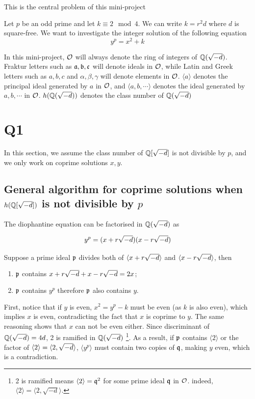 This is the central problem of this mini-project
\begin{problem}
	Let $p$ be an odd prime and let $k \equiv 2 \mod 4$. 
	We can write $k = r^2d$ where $d$ is square-free. 
	We want to investigate the integer solution of the following equation
	\begin{equation}\label{eq:main}
	y^p = x^2 + k
\end{equation}
\end{problem}

In this mini-project, $\mathcal{O}$ will always denote the ring of integers of $\mathbb{Q}(\sqrt{-d})$. 
Fraktur letters such as $\mathfrak{a}, \mathfrak{b}, \mathfrak{c}$ will denote ideals in $\mathcal{O}$, while Latin and Greek letters such as $a, b, c$ and $\alpha, \beta, \gamma$ will denote elements in $\mathcal{O}$.
$\langle a \rangle$ denotes the principal ideal generated by $a$ in $\mathcal{O}$, and $\langle a, b, \cdots \rangle$ denotes the ideal generated by $a, b, \cdots$ in $\mathcal{O}$.
$h(\mathbb{Q}(\sqrt{-d}))$ denotes the class number of $\mathbb{Q}(\sqrt{-d})$

\section{Q1}

In this section, we assume the class number of $\mathbb{Q}[\sqrt{-d}]$ is not divisible by $p$, and we only work on coprime solutions $x, y$.

\subsection{General algorithm for coprime solutions when \texorpdfstring{$h(\mathbb{Q}[\sqrt{-d}])$ is not divisible by $p$}{}}

The diophantine equation can be factorised in $\mathbb{Q}(\sqrt{-d})$ as 

$$
	y^p = (x+ r \sqrt{-d}) (x - r \sqrt{-d})
$$

Suppose a prime ideal $\mathfrak{p}$ divides both of $\langle x + r \sqrt{-d} \rangle$ and $\langle x - r \sqrt{-d} \rangle$, then 
\begin{enumerate}
	\item $\mathfrak{p}$ contains $x + r \sqrt{-d} + x - r \sqrt{-d} = 2x$;
	\item $\mathfrak{p}$ contains $y^p$ therefore $\mathfrak{p}$ also contains $y$.
\end{enumerate}
First, notice that if $y$ is even, $x^2 = y^p - k$ must be even (as $k$ is also even), which implies $x$ is even, contradicting the fact that $x$ is coprime to $y$. 
The same reasoning shows that $x$ can not be even either. 
Since discriminant of $\mathbb{Q}(\sqrt{-d}) = 4d$, 2 is ramified in $\mathbb{Q}(\sqrt{-d})$ \footnote{2 is ramified means $\langle 2 \rangle = \mathfrak{q}^2$ for some prime ideal $\mathfrak{q}$ in $\mathcal{O}$. 
indeed, $\langle 2 \rangle = \langle 2, \sqrt{-d}\rangle$.}.
As a result, if $\mathfrak{p}$ contains $\langle 2\rangle$ or the factor of $\langle 2 \rangle = \langle 2, \sqrt{-d} \rangle$, $\langle y^p \rangle$ must contain two copies of $\mathfrak{q}$, making $y$ even, which is a contradiction.

